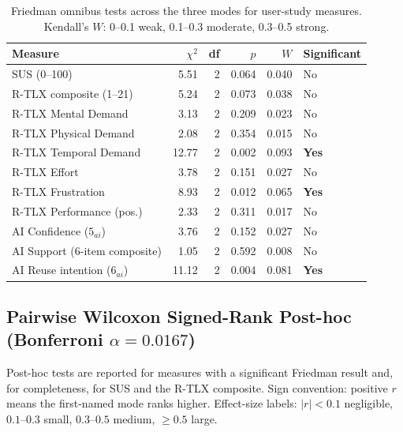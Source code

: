 \begin{table}[htbp]
\centering
\caption{Friedman omnibus tests across the three modes for user-study measures.
Kendall's $W$: 0--0.1 weak, 0.1--0.3 moderate, 0.3--0.5 strong.}
\label{tab:app-survey-friedman}
\small
\begin{tabular}{@{}l r r r r l@{}}
\toprule
Measure & $\chi^2$ & df & $p$ & $W$ & Significant \\
\midrule
SUS (0--100)                    & 5.51  & 2 & 0.064  & 0.040 & No \\
R-TLX composite (1--21)         & 5.24  & 2 & 0.073  & 0.038 & No \\
R-TLX Mental Demand             & 3.13  & 2 & 0.209  & 0.023 & No \\
R-TLX Physical Demand           & 2.08  & 2 & 0.354  & 0.015 & No \\
R-TLX Temporal Demand           & 12.77 & 2 & 0.002  & 0.093 & \textbf{Yes} \\
R-TLX Effort                    & 3.78  & 2 & 0.151  & 0.027 & No \\
R-TLX Frustration               & 8.93  & 2 & 0.012  & 0.065 & \textbf{Yes} \\
R-TLX Performance (pos.)        & 2.33  & 2 & 0.311  & 0.017 & No \\
AI Confidence ($5_{ai}$)        & 3.76  & 2 & 0.152  & 0.027 & No \\
AI Support (6-item composite)   & 1.05  & 2 & 0.592  & 0.008 & No \\
AI Reuse intention ($6_{ai}$)   & 11.12 & 2 & 0.004  & 0.081 & \textbf{Yes} \\
\bottomrule
\end{tabular}
\end{table}

\subsection{Pairwise Wilcoxon Signed-Rank Post-hoc (Bonferroni $\alpha = 0.0167$)}

Post-hoc tests are reported for measures with a significant Friedman result
and, for completeness, for SUS and the R-TLX composite. Sign convention:
positive $r$ means the first-named mode ranks higher. Effect-size labels:
$|r| < 0.1$ negligible, $0.1$--$0.3$ small, $0.3$--$0.5$ medium, $\geq 0.5$ large.


